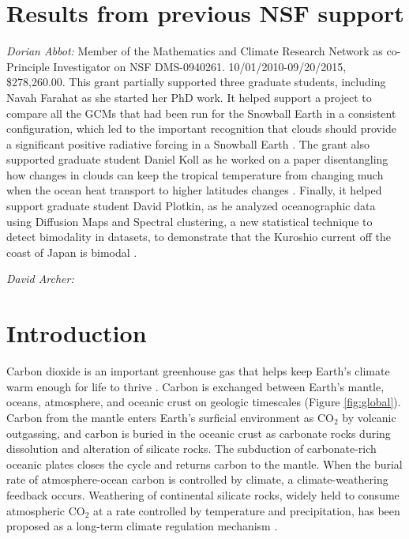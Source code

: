 \documentclass[authoryear,round,12pt]{article}
\begin{document}
\bigskip

\tableofcontents

\bigskip

\section{Results from previous NSF support}
\label{sec:prior-support}

\textit{Dorian Abbot:} Member of the Mathematics and Climate Research
Network as co-Principle Investigator on NSF
DMS-0940261. 10/01/2010-09/20/2015, \$278,260.00. This grant partially
supported three graduate students, including Navah Farahat as she
started her PhD work. It helped support a project to compare all the
GCMs that had been run for the Snowball Earth in a consistent
configuration, which led to the important recognition that clouds
should provide a significant positive radiative forcing in a Snowball
Earth
\citep{abbot12-snowball-clouds,abbot13-snowball-circulation}. The
grant also supported graduate student Daniel Koll as he worked on a
paper disentangling how changes in clouds can keep the tropical
temperature from changing much when the ocean heat transport to higher
latitudes changes \citep{Koll:2013}. Finally, it helped support
graduate student David Plotkin, as he analyzed oceanographic data
using Diffusion Maps and Spectral clustering, a new statistical
technique to detect bimodality in datasets, to demonstrate that the
Kuroshio current off the coast of Japan is bimodal
\citep{Plotkin2014}.

  
\textit{David Archer:} 

\section{Introduction}
\label{sec:introduction}
  


Carbon dioxide is an important greenhouse gas that helps keep Earth's
climate warm enough for life to thrive
\citep{Pierrehumbert:2010-book}. Carbon is exchanged between Earth's
mantle, oceans, atmosphere, and oceanic crust on geologic timescales
(Figure \ref{fig:global}). Carbon from the mantle enters Earth's
surficial environment as CO$_2$ by volcanic outgassing, and carbon is
buried in the oceanic crust as carbonate rocks during dissolution and
alteration of silicate rocks. The subduction of carbonate-rich oceanic
plates closes the cycle and returns carbon to the mantle. When the
burial rate of atmosphere-ocean carbon is controlled by climate, a
climate-weathering feedback occurs. Weathering of continental silicate
rocks, widely held to consume atmospheric CO$_2$ at a rate controlled
by temperature and precipitation, has been proposed as a long-term
climate regulation mechanism \citep{walker1981, berner1983,
  caldeira1995, berner2001, berner2006, arvidson2006}.
\end{document}
